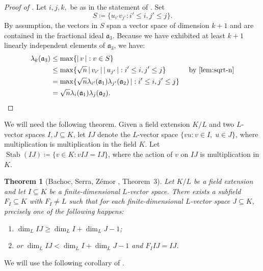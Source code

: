 \documentclass[letterpaper,10pt]{amsart}
\DeclareMathOperator{\Stab}{Stab}
\DeclareMathOperator{\lv}{\lvert}
\DeclareMathOperator{\rv}{\rvert}
\newcommand{\mfa}{\mathfrak{a}}
\newtheorem{theorem}{Theorem}[section]
\theoremstyle{definition}
\theoremstyle{remark}
\begin{document}
\begin{proof}[Proof of ]
Let $i,j,k,$ be as in the statement of . Set
\[
    S \coloneqq \{u_{i'}v_{j'} : i' \leq i, j' \leq j\}.
\]
By assumption, the vectors in $S$ span a vector space of dimension $k+1$ and are contained in the fractional ideal $\mfa_3$. Because we have exhibited at least $k+1$ linearly independent elements of $\mfa_3$, we have:
\begin{align*}
\lambda_k(\mfa_3) &\leq \max\{\lv v \rv : v \in S\} && \\
&\leq \max\{\sqrt{n}\lv v_{i'} \rv \lv u_{j'} \rv : i' \leq i, j' \leq j\} && \text{ by \Cref{lem:sqrt-n}} \\
&= \max\{\sqrt{n}\lambda_{i'}(\mfa_1)\lambda_{j'}(\mfa_2) \rv : i' \leq i, j' \leq j\} && \\
&= \sqrt{n}\lambda_{i}(\mfa_1)\lambda_{j}(\mfa_2). && \\
\end{align*}
\end{proof}

We will need the following theorem. Given a field extension $K/L$ and two $L$-vector spaces $I,J \subseteq K$, let $IJ$ denote the $L$-vector space $\{vu : v \in I, \; u \in J\}$, where multiplication is multiplication in the field $K$. Let $\Stab(IJ) \coloneqq \{v \in K : vIJ = IJ\}$, where the action of $v$ on $IJ$ is multiplication in $K$.

\begin{theorem}[Bachoc, Serra, Z\'emor \cite{zemorthm}, Theorem~3]
\label{thm:zemor}
Let $K/L$ be a field extension and let $I \subseteq K$ be a finite-dimensional $L$-vector space. There exists a subfield $F_I \subseteq K$ with $F_I \neq L$ such that for each finite-dimensional $L$-vector space $J \subseteq K$, precisely one of the following happens:
\begin{enumerate}
\item $\dim_L IJ \geq \dim_L I + \dim_L J  - 1$;
\item or $\dim_L IJ < \dim_L I + \dim_L J  - 1$ and $F_I IJ = IJ$.
\end{enumerate}
\end{theorem}

\noindent We will use the following corollary of . 
\end{document}
